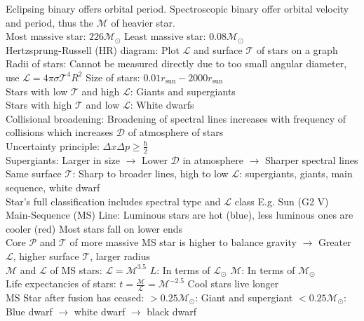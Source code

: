 \documentclass{article}
\begin{document}
Eclipsing binary offers orbital period. Spectroscopic binary offer orbital velocity and period, thus the $\mathcal{M}$ of heavier star.\\
Most massive star: $226\mathcal{M}_{\odot}$ \qquad Least massive star: $0.08\mathcal{M}_{\odot}$\\
Hertzsprung-Russell (HR) diagram: Plot $\mathcal{L}$ and surface $\mathcal{T}$ of stars on a graph\\
Radii of stars: Cannot be measured directly due to too small angular diameter, use $\mathcal{L}=4\pi\sigma\mathcal{T}^{4}R^{2}$ \quad Size of stars: $0.01r_{\text{sun}}-2000r_{\text{sun}}$\\
Stars with low $\mathcal{T}$ and high $\mathcal{L}$: Giants and supergiants\\
Stars with high $\mathcal{T}$ and low $\mathcal{L}$: White dwarfs\\
Collisional broadening: Broadening of spectral lines increases with frequency of collisions which increases $\mathcal{D}$ of atmosphere of stars\\
Uncertainty principle: $\Delta x\Delta p\geq\frac{\hbar}{2}$\\
Supergiants: Larger in size $\rightarrow$ Lower $\mathcal{D}$ in atmosphere $\rightarrow$ Sharper spectral lines\\
Same surface $\mathcal{T}$: Sharp to broader lines, high to low $\mathcal{L}$: supergiants, giants, main sequence, white dwarf\\
Star's full classification includes spectral type and $\mathcal{L}$ class E.g. Sun (G2 V)\\
Main-Sequence (MS) Line: Luminous stars are hot (blue), less luminous ones are cooler (red) \quad Most stars fall on lower ends\\
Core $\mathcal{P}$ and $\mathcal{T}$ of more massive MS star is higher to balance gravity $\rightarrow$ Greater $\mathcal{L}$, higher surface $\mathcal{T}$, larger radius\\
$\mathcal{M}$ and $\mathcal{L}$ of MS stars: $\mathcal{L}=\mathcal{M}^{3.5}$ \qquad $L$: In terms of $\mathcal{L}_{\odot}$ \quad $\mathcal{M}$: In terms of $\mathcal{M}_{\odot}$\\
Life expectancies of stars: $t=\frac{\mathcal{M}}{\mathcal{L}}=\mathcal{M}^{-2.5}$ \quad Cool stars live longer\\
MS Star after fusion has ceased: $>0.25\mathcal{M}_{\odot}$: Giant and supergiant \quad $<0.25\mathcal{M}_{\odot}$: Blue dwarf $\rightarrow$ white dwarf $\rightarrow$ black dwarf\\
\end{document}
